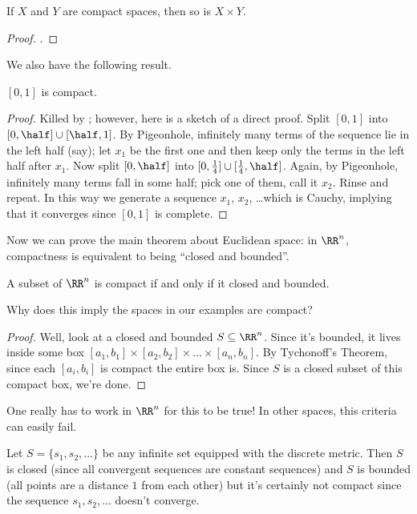 \begin{theorem}
	\label{thm:tychonoff}
	If $X$ and $Y$ are compact spaces, then so is $X \times Y$.
\end{theorem}
\begin{proof}
	.
\end{proof}

We also have the following result.
\begin{theorem}
	\label{thm:interval_compact}
	$[0,1]$ is compact.
\end{theorem}
\begin{proof}
	Killed by ;
	however, here is a sketch of a direct proof.
	Split $[0,1]$ into $[0,\half] \cup [\half,1]$.
	By Pigeonhole, infinitely many terms of the sequence lie in the left half (say);
	let $x_1$ be the first one and then keep only the terms in the left half after $x_1$.
	Now split $[0, \half]$ into $[0,\frac14] \cup [\frac14,\half]$.
	Again, by Pigeonhole, infinitely many terms fall in some half; pick one of them, call it $x_2$.
	Rinse and repeat.
	In this way we generate a sequence $x_1$, $x_2$, \dots which is Cauchy,
	implying that it converges since $[0,1]$ is complete.
\end{proof}

Now we can prove the main theorem about Euclidean space:
in $\RR^n$, compactness is equivalent to being ``closed and bounded''.
\begin{theorem}
	A subset of $\RR^n$ is compact if and only if it closed and bounded.
	\label{thm:fakeBW}
\end{theorem}
\begin{ques}
	Why does this imply the spaces in our examples are compact?
\end{ques}
\begin{proof}
	Well, look at a closed and bounded $S \subseteq \RR^n$.
	Since it's bounded, it lives inside some box $[a_1, b_1] \times [a_2, b_2] \times \dots \times [a_n, b_n]$.
	By Tychonoff's Theorem, since each $[a_i, b_i]$ is compact the entire box is.
	Since $S$ is a closed subset of this compact box, we're done.
\end{proof}

One really has to work in $\RR^n$ for this to be true!
In other spaces, this criteria can easily fail.
\begin{example}
	Let $S = \{s_1, s_2, \dots\}$ be any infinite set equipped with the discrete metric.
	Then $S$ is closed (since all convergent sequences are constant sequences)
	and $S$ is bounded (all points are a distance $1$ from each other)
	but it's certainly not compact since the sequence $s_1, s_2, \dots$ doesn't converge.
\end{example}

